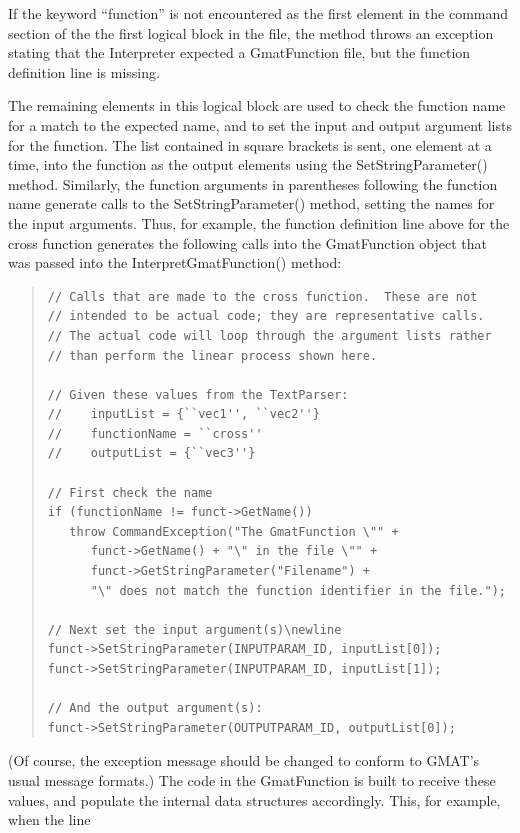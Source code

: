 \noindent If the keyword ``function'' is not encountered as the first element in the command section
of the the first logical block in the file, the method throws an exception stating that the
Interpreter expected a GmatFunction file, but the function definition line is missing.

The remaining elements in this logical block are used to check the function name for a match to the
expected name, and to set the input and output argument lists for the function.  The list contained
in square brackets is sent, one element at a time, into the function as the output elements using
the SetStringParameter() method.  Similarly, the function arguments in parentheses following the
function name generate calls to the SetStringParameter() method, setting the names for the input
arguments.  Thus, for example, the function definition line above for the cross function generates
the following calls into the GmatFunction object that was passed into the InterpretGmatFunction()
method:

\begin{quote}
\begin{verbatim}
// Calls that are made to the cross function.  These are not
// intended to be actual code; they are representative calls.
// The actual code will loop through the argument lists rather
// than perform the linear process shown here.

// Given these values from the TextParser:
//    inputList = {``vec1'', ``vec2''}
//    functionName = ``cross''
//    outputList = {``vec3''}

// First check the name
if (functionName != funct->GetName())
   throw CommandException("The GmatFunction \"" +
      funct->GetName() + "\" in the file \"" + 
      funct->GetStringParameter("Filename") + 
      "\" does not match the function identifier in the file.");

// Next set the input argument(s)\newline
funct->SetStringParameter(INPUTPARAM_ID, inputList[0]);
funct->SetStringParameter(INPUTPARAM_ID, inputList[1]);

// And the output argument(s):
funct->SetStringParameter(OUTPUTPARAM_ID, outputList[0]);
\end{verbatim}
\end{quote}

\noindent (Of course, the exception message should be changed to conform to GMAT's usual message
formats.)  The code in the GmatFunction is built to receive these values, and populate the internal
data structures accordingly.  This, for example, when the line

